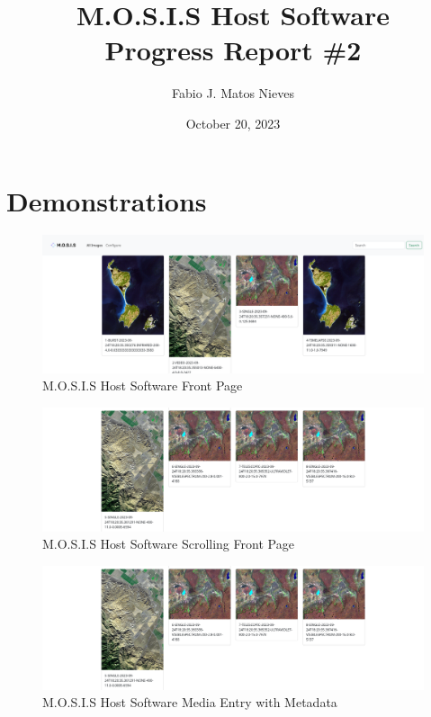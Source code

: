 \documentclass[12pt]{article}
\author{Fabio J. Matos Nieves}
\date{October 20, 2023}
\title{M.O.S.I.S Host Software\\Progress Report \#2}
\begin{document}

\tableofcontents
\newpage
\section{Demonstrations}
\begin{figure}[H]
	\caption{M.O.S.I.S Host Software Front Page}
	\includegraphics[width=\textwidth]{./Figures/demo_1.png}
\end{figure}
\begin{figure}[H]
	\caption{M.O.S.I.S Host Software Scrolling Front Page}
	\includegraphics[width=\textwidth]{./Figures/demo_2.png}
\end{figure}
\begin{figure}[H]
	\caption{M.O.S.I.S Host Software Media Entry with Metadata}
	\includegraphics[width=\textwidth]{./Figures/demo_2.png}
\end{figure}
\end{document}
